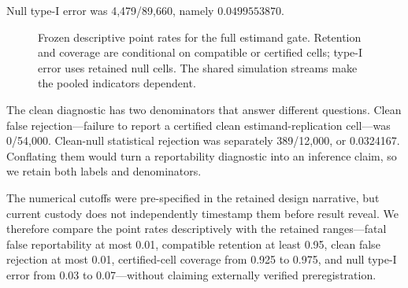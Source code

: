 \documentclass{article}
\begin{document}
Null type-I error was 4,479/89,660, namely $0.0499553870$.

\begin{figure}[t]
\centering
{}
\caption{Frozen descriptive point rates for the full estimand gate. Retention and coverage are conditional on compatible or certified cells; type-I error uses retained null cells. The shared simulation streams make the pooled indicators dependent.}
\label{fig:inference-consequence}
\end{figure}

The clean diagnostic has two denominators that answer different questions. Clean false rejection---failure to report a certified clean estimand-replication cell---was 0/54,000. Clean-null statistical rejection was separately 389/12,000, or 0.0324167. Conflating them would turn a reportability diagnostic into an inference claim, so we retain both labels and denominators.

The numerical cutoffs were pre-specified in the retained design narrative, but current custody does not independently timestamp them before result reveal. We therefore compare the point rates descriptively with the retained ranges---fatal false reportability at most 0.01, compatible retention at least 0.95, clean false rejection at most 0.01, certified-cell coverage from 0.925 to 0.975, and null type-I error from 0.03 to 0.07---without claiming externally verified preregistration.
\end{document}
